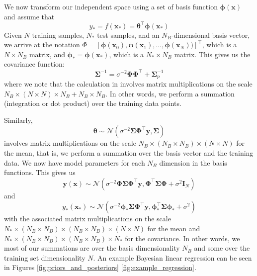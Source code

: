\documentclass{article}
\begin{document}
We now transform our independent space using a set of basis function $\boldsymbol{\phi}(\mathbf{x})$ and assume that
\begin{equation}
    y_\ast=f(\mathbf{x_\ast})=\boldsymbol{\theta}^\top\boldsymbol{\phi}(\mathbf{x_\ast})
\end{equation} 
Given $N$ training samples, $N_\ast$ test samples, and an $N_B$-dimensional basis vector, we arrive at the notation $\Phi=[\boldsymbol{\phi}(\mathbf{x}_0),\boldsymbol{\phi}(\mathbf{x}_1),\dots,\boldsymbol{\phi}(\mathbf{x}_{N}))]^\top$, which is a $N \times N_B$ matrix, and  $\boldsymbol{\phi}_\ast=\boldsymbol{\phi}(\mathbf{x}_\ast)$, which is a $N_\ast \times N_B$ matrix. This gives us the covariance function:
\begin{equation}
\label{covariance_matrix}
    \boldsymbol{\Sigma}^{-1} = \sigma^{-2} \boldsymbol{\Phi}  \boldsymbol{\Phi}^\top +  \boldsymbol{\Sigma}_p^{-1}
\end{equation} 
where we note that the calculation in involves matrix multiplications on the scale $N_B \times (N \times N) \times N_B + N_B \times N_B$. In other words, we perform a summation (integration or dot product) over the training data points.

Similarly,
\begin{equation}
\label{theta_distribution}
    \boldsymbol{\theta}\sim\mathcal{N}( \sigma^{-2}\boldsymbol{\Sigma} \boldsymbol{\Phi}^\top \mathbf{y},\boldsymbol{\Sigma})
\end{equation} 
involves matrix multiplications on the scale $N_B \times (N_B \times N_B) \times (N \times N)$ for the mean, that is, we perform a summation over the basis vector and the training data. We now have model parameters for each $N_B$ dimension in the basis functions. This gives us
\begin{equation}
\label{BLR_posterior}
    \mathbf{y}(\mathbf{x})\sim\mathcal{N}\left(\sigma^{-2}\boldsymbol{\Phi}  \boldsymbol{\Sigma} \boldsymbol{\Phi}^\top\mathbf{y} ,\boldsymbol{\Phi}^\top\boldsymbol{\Sigma}\boldsymbol{\Phi}+\sigma^2 \mathbf{I}_N\right)
\end{equation} 
and
\begin{equation}
\label{BLR_posterior}
    y_\ast(\mathbf{x}_\ast)\sim\mathcal{N}\left(\sigma^{-2}\boldsymbol{\phi}_\ast  \boldsymbol{\Sigma} \boldsymbol{\Phi}^\top\mathbf{y} ,\boldsymbol{\phi}^\top_\ast \boldsymbol{\Sigma}\boldsymbol{\phi}_\ast+ \sigma^2\right)
\end{equation} 
with the associated matrix multiplications on the scale $N_\ast \times(N_B \times N_B) \times (N_B \times N_B) \times (N \times N)$ for the mean and $N_\ast \times (N_B \times N_B) \times (N_B \times N_B) \times N_\ast$ for the covariance. In other words, we most of our summations are over the basis dimensionality $N_B$ and some over the training set dimensionality $N$. An example Bayesian linear regression can be seen in Figures  \ref{fig:priors_and_posteriors} \ref{fig:example_regression}.
\end{document}
